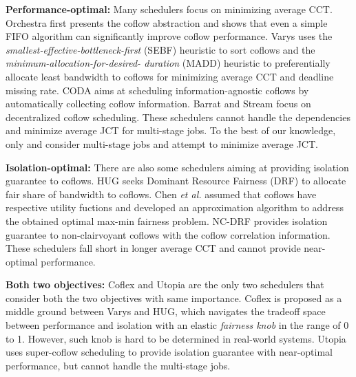 \documentclass[10pt,journal,compsoc]{IEEEtran}
\begin{document}
\noindent\textbf{Performance-optimal:} Many schedulers focus on minimizing average CCT.
%
Orchestra\cite{orchestra} first presents the coflow abstraction and shows that even a simple FIFO algorithm can significantly improve coflow performance.
%
Varys\cite{varys} uses the \emph{smallest-effective-bottleneck-first} (SEBF) heuristic to sort coflows and the \emph{minimum-allocation-for-desired- duration} (MADD) heuristic to preferentially allocate least bandwidth to coflows for minimizing average CCT and deadline missing rate.
%
CODA\cite{coda} aims at scheduling information-agnostic coflows by automatically collecting coflow information.
%
Barrat\cite{barrat} and Stream\cite{stream} focus on decentralized coflow scheduling.
%
These schedulers cannot handle the dependencies and minimize average JCT for multi-stage jobs.
%
To the best of our knowledge, only \cite{aalo} and \cite{bingchuan} consider multi-stage jobs and attempt to minimize average JCT. 

\noindent\textbf{Isolation-optimal:} There are also some schedulers aiming at providing isolation guarantee to coflows.
%
HUG\cite{HUG} seeks Dominant Resource Fairness (DRF)\cite{DRF} to allocate fair share of bandwidth to coflows.
%
Chen \emph{et al.}\cite{optimizing} assumed that coflows have respective utility fuctions and developed an approximation algorithm to address the obtained optimal max-min fairness problem.
%
NC-DRF\cite{fair} provides isolation guarantee to non-clairvoyant coflows with the coflow correlation information.
%
These schedulers fall short in longer average CCT and cannot provide near-optimal performance.

\noindent\textbf{Both two objectives:} Coflex\cite{coflex} and Utopia\cite{utopia} are the only two schedulers that consider both the two objectives with same importance.
%
Coflex is proposed as a middle ground between Varys and HUG, which navigates the tradeoff space between performance and isolation with an elastic \emph{fairness knob} in the range of 0 to 1.
%
However, such knob is hard to be determined in real-world systems.
%
Utopia uses super-coflow scheduling to provide isolation guarantee with near-optimal performance, but cannot handle the multi-stage jobs.
\end{document}
